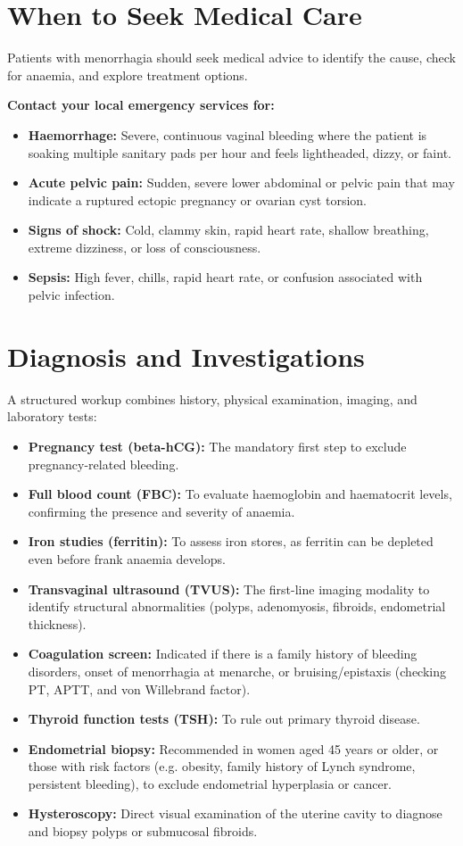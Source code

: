 \section*{When to Seek Medical Care}
Patients with menorrhagia should seek medical advice to identify the cause, check for anaemia, and explore treatment options.

\textbf{Contact your local emergency services for:}
\begin{itemize}
    \item \textbf{Haemorrhage:} Severe, continuous vaginal bleeding where the patient is soaking multiple sanitary pads per hour and feels lightheaded, dizzy, or faint.
    \item \textbf{Acute pelvic pain:} Sudden, severe lower abdominal or pelvic pain that may indicate a ruptured ectopic pregnancy or ovarian cyst torsion.
    \item \textbf{Signs of shock:} Cold, clammy skin, rapid heart rate, shallow breathing, extreme dizziness, or loss of consciousness.
    \item \textbf{Sepsis:} High fever, chills, rapid heart rate, or confusion associated with pelvic infection.
\end{itemize}

\section*{Diagnosis and Investigations}
A structured workup combines history, physical examination, imaging, and laboratory tests:
\begin{itemize}
    \item \textbf{Pregnancy test (beta-hCG):} The mandatory first step to exclude pregnancy-related bleeding.
    \item \textbf{Full blood count (FBC):} To evaluate haemoglobin and haematocrit levels, confirming the presence and severity of anaemia.
    \item \textbf{Iron studies (ferritin):} To assess iron stores, as ferritin can be depleted even before frank anaemia develops.
    \item \textbf{Transvaginal ultrasound (TVUS):} The first-line imaging modality to identify structural abnormalities (polyps, adenomyosis, fibroids, endometrial thickness).
    \item \textbf{Coagulation screen:} Indicated if there is a family history of bleeding disorders, onset of menorrhagia at menarche, or bruising/epistaxis (checking PT, APTT, and von Willebrand factor).
    \item \textbf{Thyroid function tests (TSH):} To rule out primary thyroid disease.
    \item \textbf{Endometrial biopsy:} Recommended in women aged 45 years or older, or those with risk factors (e.g. obesity, family history of Lynch syndrome, persistent bleeding), to exclude endometrial hyperplasia or cancer.
    \item \textbf{Hysteroscopy:} Direct visual examination of the uterine cavity to diagnose and biopsy polyps or submucosal fibroids.
\end{itemize}

